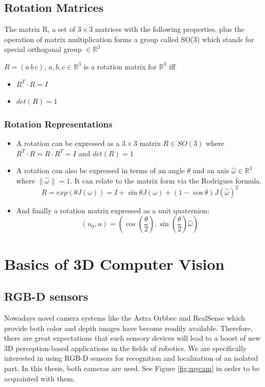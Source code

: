 \subsection{Rotation Matrices}
The matrix R, a set of $3\times3$ matrices with the following properties, plus the operation of matrix multiplication forms a group called SO(3) which stands for special orthogonal group $\in \mathbb{R}^{3} $

$R=(a\,  b\,  c), \, a,b,c \in \mathbb{R}^{3}$ is a rotation matrix for $\mathbb{R}^{3}$ iff
\begin{itemize}
\item $R^{T} \cdot R=I$
\item $det(R)=1$
\end{itemize}

\subsubsection{Rotation Representations}
\begin{itemize}
\item A rotation can be expressed as a $3\times3$ matrix $R \in SO(3)$  where $R^{T} \cdot R= R \cdot R^{T} =I$ and $det(R)=1$

\item A rotation can also be expressed in terms of an angle $\theta$  and an axis $\hat{\omega} \in \mathbb{R}^{3}$ where $\|\hat{\omega}\|=1$. It can relate to the matrix form via the Rodrigues formula.
$$R=exp(\theta J(\omega))=I+\sin \theta J(\omega)+(1-\cos \theta)J(\hat{\omega})^{2}$$

\item And finally a rotation matrix expressed as a unit quaternion:
$$(u_{0},u)=(\cos(\frac{\theta}{2}),\sin(\frac{\theta}{2})\hat{\omega})$$
\end{itemize}


\section{Basics of 3D Computer Vision}
\subsection{ RGB-D sensors} \label{rgbdcamera}
Nowadays novel camera systems like the Astra Orbbec and RealSense which provide both color and depth images have become readily available. Therefore, there are great expectations that such sensory devices will lead to a boost of new 3D perception-based applications in the fields of robotics. We are specifically interested in using RGB-D sensors for recognition and localization of an isolated part. In this thesis, both cameras are used. See Figure \ref{fig:mycam} in order to be acquainted with them.

